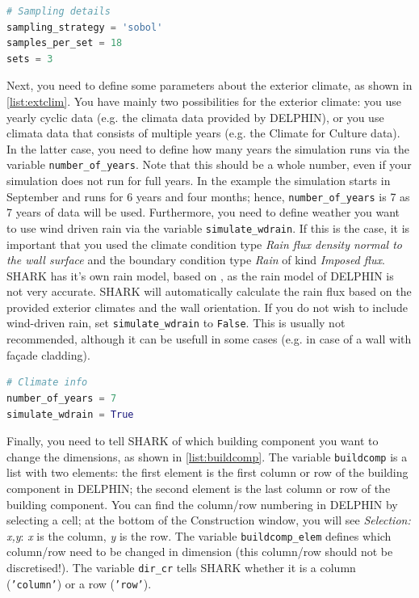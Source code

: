 \documentclass{article}
\newcommand{\code}[1]{{\small\texttt{#1}}}
\begin{document}
\begin{minipage}{\linewidth}
\begin{lstlisting}[language=Python, caption=Enter the sampling scheme details.]
# Sampling details
sampling_strategy = 'sobol'
samples_per_set = 18
sets = 3
\end{lstlisting}
\label{list:extclim}
\end{minipage}

Next, you need to define some parameters about the exterior climate, as shown in \ref{list:extclim}. You have mainly two possibilities for the exterior climate: you use yearly cyclic data (e.g. the climata data provided by DELPHIN), or you use climata data that consists of multiple years (e.g. the Climate for Culture data). In the latter case, you need to define how many years the simulation runs via the variable \code{number\_of\_years}. Note that this should be a whole number, even if your simulation does not run for full years. In the example the simulation starts in September and runs for 6 years and four months; hence, \code{number\_of\_years} is 7 as 7 years of data will be used. Furthermore, you need to define weather you want to use wind driven rain via the variable \code{simulate\_wdrain}. If this is the case, it is important that you used the climate condition type \textit{Rain flux density normal to the wall surface} and the boundary condition type \textit{Rain} of kind \textit{Imposed flux}. SHARK has it's own rain model, based on \cite{Blocken2004}, as the rain model of DELPHIN is not very accurate. SHARK will automatically calculate the rain flux based on the provided exterior climates and the wall orientation. If you do not wish to include wind-driven rain, set \code{simulate\_wdrain} to \code{False}. This is usually not recommended, although it can be usefull in some cases (e.g. in case of a wall with fa\c{c}ade cladding).

\begin{minipage}{\linewidth}
\begin{lstlisting}[language=Python, caption=Provide the exterior climate details.]
# Climate info
number_of_years = 7
simulate_wdrain = True 
\end{lstlisting}
\label{list:sampling}
\end{minipage}

Finally, you need to tell SHARK of which building component you want to change the dimensions, as shown in \ref{list:buildcomp}. The variable \code{buildcomp} is a list with two elements: the first element is the first column or row of the building component in DELPHIN; the second element is the last column or row of the building component. You can find the column/row numbering in DELPHIN by selecting a cell; at the bottom of the Construction window, you will see \textit{Selection: x,y}: \textit{x} is the column, \textit{y} is the row. The variable \code{buildcomp\_elem} defines which column/row need to be changed in dimension (this column/row should not be discretised!). The variable \code{dir\_cr} tells SHARK whether it is a column (\code{'column'}) or a row (\code{'row'}).
\end{document}
